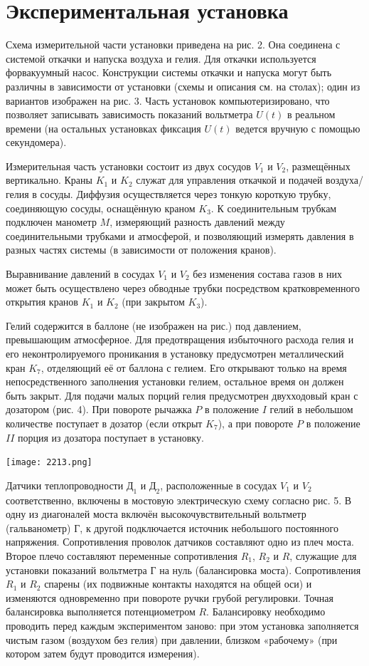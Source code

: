\section{Экспериментальная установка}

Схема измерительной части установки приведена на рис. 2. Она соединена с системой откачки и напуска воздуха и гелия. Для откачки используется форвакуумный насос. Конструкции системы откачки и напуска могут быть различны в зависимости от установки (схемы и описания см. на столах); один из вариантов изображен на рис. 3. Часть установок компьютеризировано, что позволяет записывать зависимость показаний вольтметра $U(t)$ в реальном времени (на остальных установках фиксация $U(t)$ ведется вручную с помощью секундомера).

Измерительная часть установки состоит из двух сосудов $V_1$ и $V_2$, размещённых вертикально. Краны $K_1$ и $K_2$ служат для управления откачкой и подачей воздуха/гелия в сосуды. Диффузия осуществляется через тонкую короткую трубку, соединяющую сосуды, оснащённую краном $K_3$. К соединительным трубкам подключен манометр $M$, измеряющий разность давлений между соединительными трубками и атмосферой, и позволяющий измерять давления в разных частях системы (в зависимости от положения кранов).

Выравнивание давлений в сосудах $V_1$ и $V_2$ без изменения состава газов в них может быть осуществлено через обводные трубки посредством кратковременного открытия кранов $K_1$ и $K_2$ (при закрытом $K_3$).

Гелий содержится в баллоне (не изображен на рис.) под давлением, превышающим атмосферное. Для предотвращения избыточного расхода гелия и его неконтролируемого проникания в установку предусмотрен металлический кран $K_7$, отделяющий её от баллона с гелием. Его открывают только на время непосредственного заполнения установки гелием, остальное время он должен быть закрыт. Для подачи малых порций гелия предусмотрен двухходовый кран с дозатором (рис. 4). При повороте рычажка $P$ в положение $I$ гелий в небольшом количестве поступает в дозатор (если открыт $K_7$), а при повороте $P$ в положение $II$ порция из дозатора поступает в установку.
\begin{center}
    \texttt{[image: 2213.png]}
\end{center}
Датчики теплопроводности $\text{Д}_1$ и $\text{Д}_2$, расположенные в сосудах $V_1$ и $V_2$ соответственно, включены в мостовую электрическую схему согласно рис. 5. В одну из диагоналей моста включён высокочувствительный вольтметр (гальванометр) Г, к другой подключается источник небольшого постоянного напряжения. Сопротивления проволок датчиков составляют одно из плеч моста. Второе плечо составляют переменные сопротивления $R_1$, $R_2$ и $R$, служащие для установки показаний вольтметра Г на нуль (балансировка моста). Сопротивления $R_1$ и $R_2$ спарены (их подвижные контакты находятся на общей оси) и изменяются одновременно при повороте ручки грубой регулировки. Точная балансировка выполняется потенциометром $R$. Балансировку необходимо проводить перед каждым экспериментом заново: при этом установка заполняется чистым газом (воздухом без гелия) при давлении, близком «рабочему» (при котором затем будут проводится измерения).

